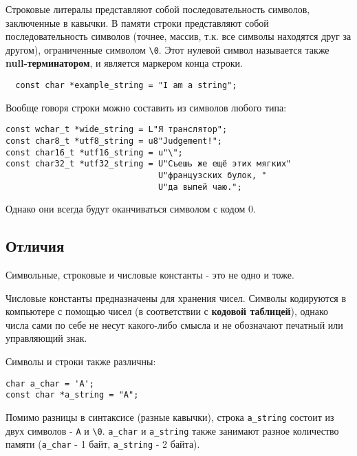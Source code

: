 Строковые литералы представляют собой последовательность символов,
заключенные в кавычки. В памяти строки представляют собой
последовательность символов (точнее, массив, т.к. все символы находятся
друг за другом), ограниченные символом \texttt{\textbackslash{}0}. Этот
нулевой символ называется также \textbf{null-терминатором}, и является
маркером конца строки.

\begin{verbatim}
  const char *example_string = "I am a string";
\end{verbatim}
Вообще говоря строки можно составить из символов любого типа:

\begin{verbatim}
const wchar_t *wide_string = L"Я транслятор";
const char8_t *utf8_string = u8"Judgement!";
const char16_t *utf16_string = u"\";
const char32_t *utf32_string = U"Съешь же ещё этих мягких"
                               U"французских булок, "
                               U"да выпей чаю.";
\end{verbatim}

Однако они всегда будут оканчиваться символом с кодом 0.

\subsection{Отличия}\label{ux43eux442ux43bux438ux447ux438ux44f}

Символьные, строковые и числовые константы - это не одно и тоже.

Числовые константы предназначены для хранения чисел. Символы кодируются
в компьютере с помощью чисел (в соответствии с \textbf{кодовой
таблицей}), однако числа сами по себе не несут какого-либо смысла и не
обозначают печатный или управляющий знак.

Символы и строки также различны:

\begin{verbatim}
char a_char = 'A';
const char *a_string = "A";
\end{verbatim}

Помимо разницы в синтаксисе (разные кавычки), строка \texttt{a\_string}
состоит из двух символов -
\texttt{\textquotesingle{}A\textquotesingle{}} и
\texttt{\textquotesingle{}\textbackslash{}0\textquotesingle{}}.
\texttt{a\_char} и \texttt{a\_string} также занимают разное количество
памяти (\texttt{a\_char} - 1 байт, \texttt{a\_string} - 2 байта).
